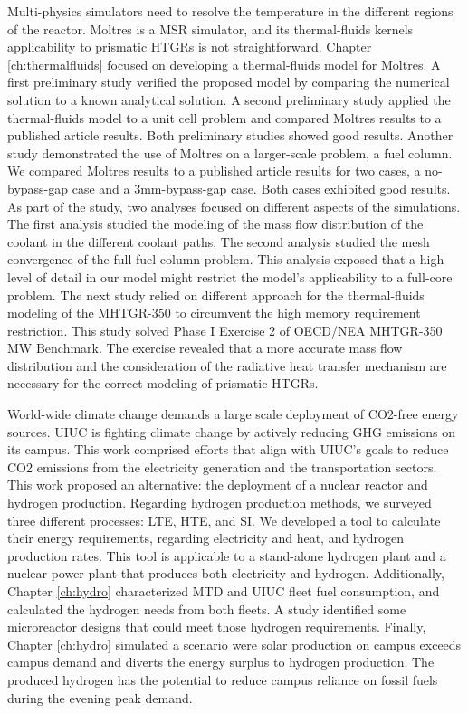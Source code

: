 Multi-physics simulators need to resolve the temperature in the different regions of the reactor.
Moltres is a MSR simulator, and its thermal-fluids kernels applicability to prismatic HTGRs is not straightforward.
Chapter \ref{ch:thermalfluids} focused on developing a thermal-fluids model for Moltres.
A first preliminary study verified the proposed model by comparing the numerical solution to a known analytical solution.
A second preliminary study applied the thermal-fluids model to a unit cell problem and compared Moltres results to a published article results.
Both preliminary studies showed good results.
Another study demonstrated the use of Moltres on a larger-scale problem, a fuel column.
We compared Moltres results to a published article results for two cases, a no-bypass-gap case and a 3mm-bypass-gap case.
Both cases exhibited good results.
As part of the study, two analyses focused on different aspects of the simulations.
The first analysis studied the modeling of the mass flow distribution of the coolant in the different coolant paths.
The second analysis studied the mesh convergence of the full-fuel column problem.
This analysis exposed that a high level of detail in our model might restrict the model's applicability to a full-core problem.
The next study relied on different approach for the thermal-fluids modeling of the MHTGR-350 to circumvent the high memory requirement restriction.
This study solved Phase I Exercise 2 of OECD/NEA MHTGR-350 MW Benchmark.
The exercise revealed that a more accurate mass flow distribution and the consideration of the radiative heat transfer mechanism are necessary for the correct modeling of prismatic HTGRs.

World-wide climate change demands a large scale deployment of \gls{CO2}-free energy sources.
UIUC is fighting climate change by actively reducing GHG emissions on its campus.
This work comprised efforts that align with UIUC's goals to reduce \gls{CO2} emissions from the electricity generation and the transportation sectors.
This work proposed an alternative: the deployment of a nuclear reactor and hydrogen production.
Regarding hydrogen production methods, we surveyed three different processes: LTE, HTE, and SI.
We developed a tool to calculate their energy requirements, regarding electricity and heat, and hydrogen production rates.
This tool is applicable to a stand-alone hydrogen plant and a nuclear power plant that produces both electricity and hydrogen.
Additionally, Chapter \ref{ch:hydro} characterized MTD and UIUC fleet fuel consumption, and calculated the hydrogen needs from both fleets.
A study identified some microreactor designs that could meet those hydrogen requirements.
Finally, Chapter \ref{ch:hydro} simulated a scenario were solar production on campus exceeds campus demand and diverts the energy surplus to hydrogen production.
The produced hydrogen has the potential to reduce campus reliance on fossil fuels during the evening peak demand.

